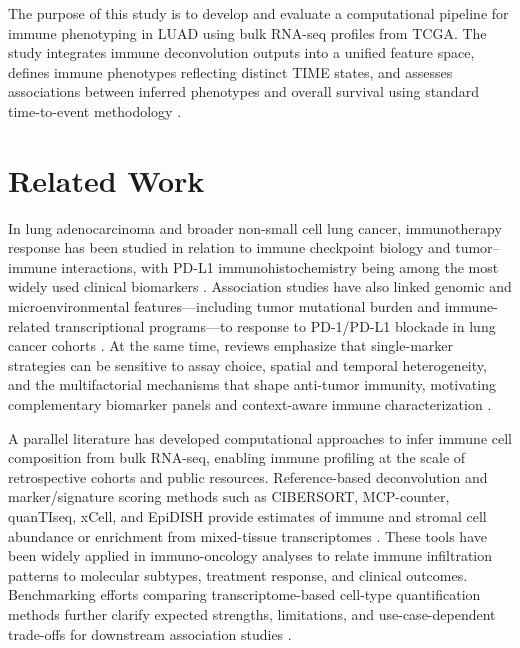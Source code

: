 \documentclass[conference]{IEEEtran}
\begin{document}
The purpose of this study is to develop and evaluate a computational pipeline for immune phenotyping in LUAD using bulk RNA-seq profiles from TCGA.
The study integrates immune deconvolution outputs into a unified feature space, defines immune phenotypes reflecting distinct TIME states, and assesses associations between inferred phenotypes and overall survival using standard time-to-event methodology \cite{KaplanMeier1958,Cox1972}.
\section{Related Work}
In lung adenocarcinoma and broader non-small cell lung cancer, immunotherapy response has been studied in relation to immune checkpoint biology and tumor--immune interactions, with PD-L1 immunohistochemistry being among the most widely used clinical biomarkers \cite{Pardoll2012,SharmaAllison2015,Topalian2012,Garon2015,Herbst2018}.
Association studies have also linked genomic and microenvironmental features---including tumor mutational burden and immune-related transcriptional programs---to response to PD-1/PD-L1 blockade in lung cancer cohorts \cite{Rizvi2015,Rizvi2018}.
At the same time, reviews emphasize that single-marker strategies can be sensitive to assay choice, spatial and temporal heterogeneity, and the multifactorial mechanisms that shape anti-tumor immunity, motivating complementary biomarker panels and context-aware immune characterization \cite{SharmaAllison2015,ChenMellman2017}.

A parallel literature has developed computational approaches to infer immune cell composition from bulk RNA-seq, enabling immune profiling at the scale of retrospective cohorts and public resources.
Reference-based deconvolution and marker/signature scoring methods such as CIBERSORT, MCP-counter, quanTIseq, xCell, and EpiDISH provide estimates of immune and stromal cell abundance or enrichment from mixed-tissue transcriptomes \cite{Newman2015,Becht2016,Finotello2019,Aran2017xCell,Zheng2017EpiDISH}.
These tools have been widely applied in immuno-oncology analyses to relate immune infiltration patterns to molecular subtypes, treatment response, and clinical outcomes.
Benchmarking efforts comparing transcriptome-based cell-type quantification methods further clarify expected strengths, limitations, and use-case-dependent trade-offs for downstream association studies \cite{Sturm2019}.
\end{document}
